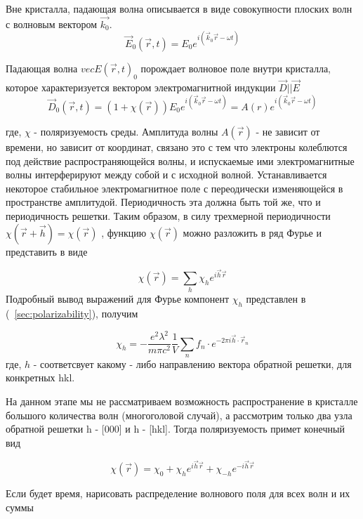 
Вне кристалла, падающая волна описывается в виде совокупности плоских волн с волновым вектором  $\vec{k_0}$.
\begin{equation}
  \vec{E}_0(\vec{r},t) = E_0 e^{i(\vec{k}_0\vec{r}-\omega t)}
 \end{equation}

Падающая волна $vec{E}(\vec{r},t)_0$ порождает волновое поле внутри кристалла, которое характеризуется вектором
электромагнитной индукции $\vec{D}||\vec{E}$
\begin{equation}
 \vec{D}_0(\vec{r},t) = (1+\chi(\vec{r})) E_0 e^{i(\vec{k}_0\vec{r}-\omega t)} = A(r) e^{i(\vec{k}_0\vec{r}-\omega t)}
\end{equation}

где, $\chi$ - поляризуемость среды. Амплитуда волны $A(\vec{r})$ - не зависит
от времени, но зависит от координат, связано
это с тем что электроны колеблются под действие распространяющейся волны, и испускаемые ими
электромагнитные волны интерферируют между собой и с исходной волной. Устанавливается некоторое стабильное
электромагнитное поле с переодически изменяющейся в пространстве амплитудой. Периодичность эта должна быть
той же, что и периодичность решетки. Таким образом, в силу трехмерной периодичности $\chi(\vec{r}+\vec{h}) = \chi(\vec{r})$
, функцию $\chi(\vec{r})$ можно разложить в ряд Фурье и представить в виде

\begin{equation}
\chi(\vec{r}) = \sum_{h}\chi_h e^{i\vec{h}\vec{r}}
\end{equation}
Подробный вывод выражений для Фурье компонент $\chi_h$ представлен в (~\ref{sec:polarizability}), получим


\begin{equation}
\chi_h = -\frac{e^2 \lambda^2}{m \pi c^2} \frac{1}{V} \sum_{n} f_n \cdot e^{-2\pi i\vec{h}\cdot \vec{r}_n}
\end{equation}
где, $h$ - соответсвует какому - либо направлению вектора обратной решетки, для конкретных {hkl}.

На данном этапе мы не рассматриваем возможность распространение в кристалле большого количества
волн (многоголовой случай), а рассмотрим только два узла обратной решетки h - [000] и h - [hkl].
Тогда поляризуемость примет конечный вид

\begin{equation}
\chi(\vec{r}) = \chi_0 + \chi_h e^{i\vec{h}\vec{r}} + \chi_{-h} e^{-i\vec{h}\vec{r}}
\end{equation}

\textcolor{mygreen}{Если будет время, нарисовать распределение волнового поля для всех волн и их суммы}
